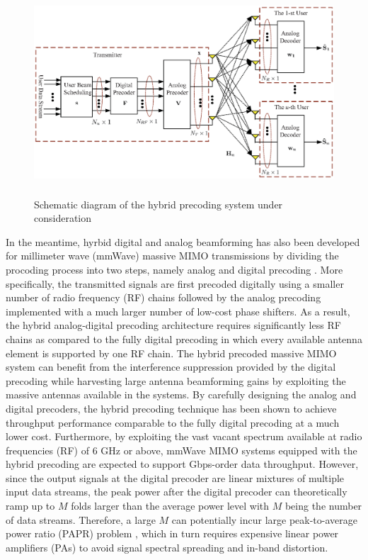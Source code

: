 \documentclass[conference]{IEEEtran}
\begin{document}
\begin{figure}[htpb]
\centering
\begin{minipage}[t]{0.7\linewidth}
	\includegraphics[width=5.6in,height=3in]{Figure/SystemSchematic_new.eps}
	\caption{Schematic diagram of the hybrid precoding system under consideration}\label{fig:BlockDiagram}
	\parbox{6.5cm}{\small \hspace{1.5cm} }
\end{minipage}
\end{figure}



In the meantime, hyrbid digital and analog beamforming has also been developed for millimeter wave (mmWave) massive MIMO transmissions by dividing the procoding process into two steps, namely analog and digital precoding \cite{han2015large, el2014spatially}. More specifically, the transmitted signals are first precoded digitally using a smaller number of radio frequency (RF) chains followed by the analog precoding implemented with a much larger number of low-cost phase shifters. As a result, the hybrid analog-digital precoding architecture requires significantly less RF chains as compared to the fully digital precoding in which every available antenna element is supported by one RF chain. The hybrid precoded massive MIMO system can benefit from the interference suppression provided by the digital precoding while harvesting large antenna beamforming gains by exploiting the massive antennas available in the systems. By carefully designing the analog and digital precoders, the hybrid precoding technique has been shown to achieve throughput performance comparable to the fully digital precoding at a much lower cost\cite{alkhateeb2014channel}. Furthermore, by exploiting the vast vacant spectrum available at radio frequencies (RF) of $6$ GHz or above, mmWave MIMO systems equipped with the hybrid precoding are expected to support Gbps-order data throughput. However, since the output signals at the digital precoder are linear mixtures of multiple input data streams, the peak power after the digital precoder can theoretically ramp up to $M$ folds larger than the average power level with $M$ being the number of data streams. Therefore, a large $M$ can potentially incur large peak-to-average power ratio (PAPR) problem \cite{mohammed2013per,Chen2017}, which in turn requires expensive linear power amplifiers (PAs) to avoid signal spectral spreading and in-band distortion.
\end{document}
